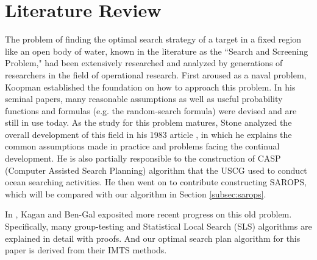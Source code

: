 \documentclass[12pt, letterpaper]{article}  %
\theoremstyle{definition}
\theoremstyle{remark}
\theoremstyle{plain}
\begin{document}
\begin{itemize}
\end{itemize}




\section{Literature Review}\label{sec:litrev}


The problem of finding the optimal search strategy of a target in a fixed region like an open body of water, known in the literature as the ``Search and Screening Problem," had been extensively researched and analyzed by generations of researchers in the field of operational research. First aroused as a naval problem, Koopman \cite{46koopman} established the foundation on how to approach this problem. In his seminal papers, many reasonable assumptions as well as useful probability functions and formulas (e.g. the random-search formula) were devised and are still in use today. As the study for this problem matures, Stone analyzed the overall development of this field in his 1983 article \cite{83stone}, in which he explains the common assumptions made in practice and problems facing the continual development. He is also partially responsible to the construction of CASP (Computer Assisted Search Planning) algorithm that the USCG used to conduct ocean searching activities. He then went on to contribute constructing SAROPS, which will be compared with our algorithm in Section \ref{subsec:sarops}.

In \cite{13kagan}, Kagan and Ben-Gal exposited more recent progress on this old problem. Specifically, many group-testing and Statistical Local Search (SLS) algorithms are explained in detail with proofs. And our optimal search plan algorithm for this paper is derived from their IMTS methods.




\end{document}
